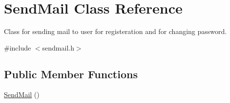 \hypertarget{classSendMail}{\section{Send\-Mail Class Reference}
\label{classSendMail}
}


Class for sending mail to user for registeration and for changing password.  




{\ttfamily \#include $<$sendmail.\-h$>$}

\subsection*{Public Member Functions}
\begin{DoxyCompactItemize}
\item 
\hypertarget{classSendMail_ae0d11ddeda1ae7ae1cc3b8f11678ed92}{\hyperlink{classSendMail_ae0d11ddeda1ae7ae1cc3b8f11678ed92}{Send\-Mail} ()}\label{classSendMail_ae0d11ddeda1ae7ae1cc3b8f11678ed92}


\end{DoxyCompactItemize}
